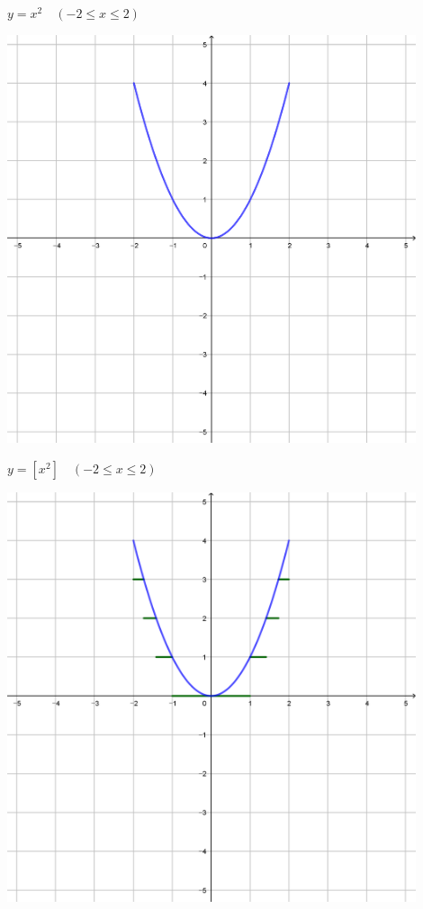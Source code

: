 \documentclass[a4paper]{oblivoir}
\begin{document}
\begin{minipage}{0.45\textwidth}\centering
\(y=x^2\quad(-2\le x\le2)\)
\par\bigskip\includegraphics[width=0.9\textwidth]{img/y=x^2}
\end{minipage}
\begin{minipage}{0.45\textwidth}\centering
\(y=[x^2]\quad(-2\le x\le2)\)
\par\bigskip\includegraphics[width=0.9\textwidth]{img/y=[x^2]}
\end{minipage}\bigskip\bigskip\par
\end{document}
